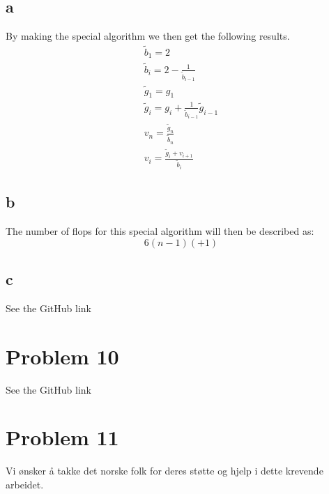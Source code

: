 \documentclass[english,notitlepage]{revtex4-1}  %
\begin{document}
    \subsection*{a}
        \label{sec:9a}
        By making the special algorithm we then get the following results. 
        \begin{align*}
                \tilde{b}_1 
            =   2\\
                \tilde{b}_i
            =   2 - \frac{1}{\tilde{b}_{i-1}}\\
                \tilde{g}_1 
            =   g_1\\
                \tilde{g}_i 
            =   g_i + \frac{1}{\tilde{b}_{i-1}}\tilde{g}_{i-1}\\
                v_n 
            =   \frac{\tilde{g}_n}{\tilde{b}_n}\\
                v_i 
            =   \frac{\tilde{g}_i+v_{i+1}}{\tilde{b}_i}
        \end{align*}
    \subsection*{b}
        \label{sec:9b}
        The number of flops for this special algorithm will then be described as: $$6(n-1)(+1)$$
    \subsection*{c}
        \label{sec:9c}
        See the GitHub link


\section*{Problem 10}
See the GitHub link


\section*{Problem 11}
        



\begin{acknowledgements}
Vi ønsker å takke det norske folk for deres støtte og hjelp i dette krevende arbeidet. 
\end{acknowledgements}

   
\end{document}
